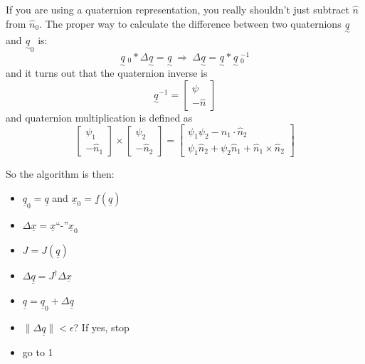 \documentclass[]{article}
\begin{document}
If you are using a quaternion representation, you really shouldn't just subtract $\hat{n}$ from $\hat{n}_{0}$. The proper way to calculate the difference between two quaternions $\underset{\sim}{q}$ and $\underset{\sim}{q}_{0}$ is:
\begin{displaymath}
\underset{\sim}{q}\ \!\!_{0} * \Delta {\underset{\sim}{q}} = \underset{\sim}{q}\ \Rightarrow\ \Delta {\underset{\sim}{q}} = \underset{\sim}{q} * \underset{\sim}{q}\ \!\!_{0}^{-1}
\end{displaymath}
and it turns out that the quaternion inverse is
\begin{displaymath}
{\underset{\sim}{q}}^{-1} = \left[\begin{array}{c} \psi \\ - \hat{n} \end{array}\right]
\end{displaymath}
and quaternion multiplication is defined as
\begin{displaymath}
	\left[\begin{array}{c} \psi_{1} \\ - \hat{n}_{1} \end{array}\right] \times \left[\begin{array}{c} \psi_{2} \\ - \hat{n}_{2} \end{array}\right] = \left[\begin{array}{c} \psi_{1}\psi_{2} - \hat{n}_{1}\cdot\hat{n}_{2} \\ \psi_{1}\hat{n}_{2} + \psi_{2}\hat{n}_{1} + \hat{n}_{1} \times \hat{n}_{2} \end{array}\right]
\end{displaymath}


So the algorithm is then:
\begin{itemize}
	\item[1] $\underline{q}_{0}=\underline{q}$ and $\underline{x}_{0} = \underline{f}(\underline{q})$
	\item[2] $\Delta\underline{x} = \underline{x}$``-''$\underline{x}_{0}$
	\item[3] $J=J(\underline{q})$
	\item[4] $\Delta \underline{q} = J^{\dag}\Delta \underline{x}$
	\item[5] $\underline{q} = \underline{q}_{0} + \Delta \underline{q}$
	\item[6] $\|\Delta \underline{q}\| < \epsilon$? If yes, stop
	\item[7] go to 1
\end{itemize}
\end{document}
